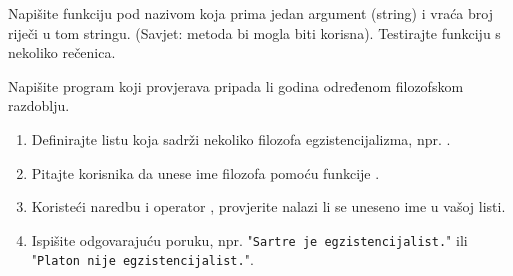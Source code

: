 \begin{vježba}
    Napišite funkciju pod nazivom  koja prima jedan argument (string) i vraća broj riječi u tom stringu. (Savjet: metoda  bi mogla biti korisna). Testirajte funkciju s nekoliko rečenica.
\end{vježba}

\begin{vježba}
    Napišite program koji provjerava pripada li godina određenom filozofskom razdoblju.
    \begin{enumerate}
        \item Definirajte listu koja sadrži nekoliko filozofa egzistencijalizma, npr. .
        \item Pitajte korisnika da unese ime filozofa pomoću funkcije .
        \item Koristeći  naredbu i operator , provjerite nalazi li se uneseno ime u vašoj listi.
        \item Ispišite odgovarajuću poruku, npr. "\texttt{Sartre je egzistencijalist.}" ili "\texttt{Platon nije egzistencijalist.}".
    \end{enumerate}
\end{vježba}